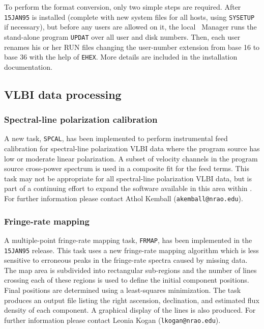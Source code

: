 To perform the format conversion, only two simple steps are required.
After {\tt 15JAN95} is installed (complete with new system files for
all hosts, using {\tt SYSETUP} if necessary), but before any users are
allowed on it, the local \AIPS\ Manager runs the stand-alone program
{\tt UPDAT} over all user and disk numbers.  Then, each user renames
his or her RUN files changing the user-number extension from base 16
to base 36 with the help of \hbox{{\tt EHEX}}.  More details are
included in the installation documentation.

\subsection{VLBI data processing}

\subsubsection{Spectral-line polarization calibration}

A new task, {\tt SPCAL}, has been implemented to perform instrumental
feed calibration for spectral-line polarization VLBI data where the
program source has low or moderate linear polarization.  A subset of
velocity channels in the program source cross-power spectrum is used
in a composite fit for the feed terms.  This task may not be
appropriate for all spectral-line polarization VLBI data, but is part
of a continuing effort to expand the software available in this area
within \hbox{\AIPS}.  For further information please contact Athol
Kemball ({\tt akemball@nrao.edu}).

\subsubsection{Fringe-rate mapping}

A multiple-point fringe-rate mapping task, {\tt FRMAP}, has been
implemented in the {\tt 15JAN95} release.  This task uses a new
fringe-rate mapping algorithm which is less sensitive to erroneous
peaks in the fringe-rate spectra caused by missing data.  The map area
is subdivided into rectangular sub-regions and the number of lines
crossing each of these regions is used to define the initial component
positions.  Final positions are determined using a least-squares
minimization.  The task produces an output file listing the right
ascension, declination, and estimated flux density of each component.
A graphical display of the lines is also produced.  For further
information please contact Leonia Kogan ({\tt lkogan@nrao.edu}).

